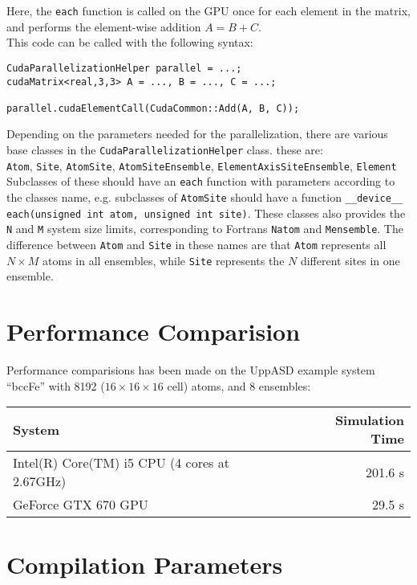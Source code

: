 \documentclass{article}
\begin{document}
Here, the \verb|each| function is called on the GPU once for each element in 
the matrix, and performs the element-wise addition $A = B + C$.\\

This code can be called with the following syntax:
\begin{verbatim}
CudaParallelizationHelper parallel = ...;
cudaMatrix<real,3,3> A = ..., B = ..., C = ...;

parallel.cudaElementCall(CudaCommon::Add(A, B, C));
\end{verbatim}

Depending on the parameters needed for the parallelization, there are various 
base classes in the \verb|CudaParallelizationHelper| class. these are:\\

\verb|Atom|, \verb|Site|, \verb|AtomSite|, \verb|AtomSiteEnsemble|, 
\verb|ElementAxisSiteEnsemble|, \verb|Element|\\

Subclasses of these should have an \verb|each| function with parameters 
according to the classes name, e.g. subclasses of \verb|AtomSite| should 
have a function \verb|__device__ each(unsigned int atom, unsigned int site)|.
These classes also provides the \verb|N| and \verb|M| system size limits, 
corresponding to Fortrans \verb|Natom| and \verb|Mensemble|. The difference 
between \verb|Atom| and \verb|Site| in these names are that \verb|Atom| 
represents all $N\times M$ atoms in all ensembles, while \verb|Site| 
represents the $N$ different sites in one ensemble.

\section{Performance Comparision}

Performance comparisions has been made on the UppASD example system 
``bccFe'' with 8192 ($16\times16\times16$ cell) atoms, and 8 ensembles:\\

\begin{tabular}{ l r }
System & Simulation Time\\
\hline
Intel(R) Core(TM) i5 CPU (4 cores at 2.67GHz) & 201.6 s \\
GeForce GTX 670 GPU & 29.5 s\\
\end{tabular}



\section{Compilation Parameters}
\end{document}
